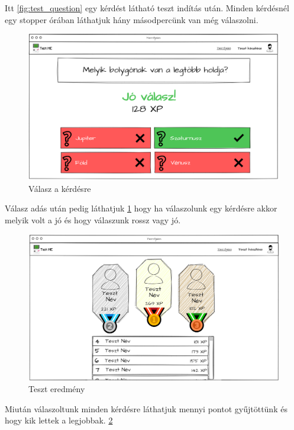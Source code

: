 Itt \ref{fig:test_question} egy kérdést látható teszt indítás után. Minden kérdésnél egy stopper órában láthatjuk hány másodpercünk van még válaszolni.

\begin{figure}[H]
    \centering
    \includegraphics[width=\linewidth]{images/test2_wireframe.png}
    \caption{Válasz a kérdésre}
    \label{fig:test_answer}
\end{figure}

Válasz adás után pedig láthatjuk \ref{fig:test_answer} hogy ha válaszolunk egy kérdésre akkor melyik volt a jó és hogy válaszunk rossz vagy jó.

\begin{figure}[H]
    \centering
    \includegraphics[width=\linewidth]{images/test3_wireframe.png}
    \caption{Teszt eredmény}
    \label{fig:test_finished}
\end{figure}

Miután válaszoltunk minden kérdésre láthatjuk mennyi pontot gyűjtöttünk és hogy kik lettek a legjobbak. \ref{fig:test_finished}



